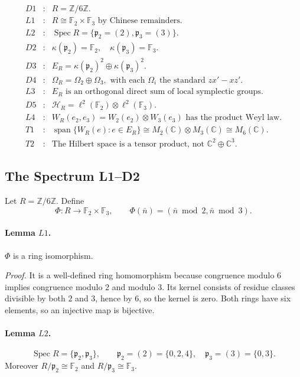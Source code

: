 \[
\begin{array}{rcl}
D1&:&R=\mathbb Z/6\mathbb Z.\\
L1&:&R\cong\mathbb F_2\times\mathbb F_3\text{ by Chinese remainders.}\\
L2&:&\operatorname{Spec}R=\{\mathfrak p_2=(2),\mathfrak p_3=(3)\}.\\
D2&:&\kappa(\mathfrak p_2)=\mathbb F_2,\quad
       \kappa(\mathfrak p_3)=\mathbb F_3.\\
D3&:&E_R=\kappa(\mathfrak p_2)^2\oplus\kappa(\mathfrak p_3)^2.\\
D4&:&\Omega_R=\Omega_2\oplus\Omega_3,\text{ with each }\Omega_i
       \text{ the standard }zx'-xz'.\\
L3&:&E_R\text{ is an orthogonal direct sum of local symplectic groups.}\\
D5&:&\mathcal H_R=\ell^2(\mathbb F_2)\otimes\ell^2(\mathbb F_3).\\
L4&:&W_R(e_2,e_3)=W_2(e_2)\otimes W_3(e_3)
       \text{ has the product Weyl law.}\\
T1&:&\operatorname{span}\{W_R(e):e\in E_R\}
       \cong M_2(\mathbb C)\otimes M_3(\mathbb C)\cong M_6(\mathbb C).\\
T2&:&\text{The Hilbert space is a tensor product, not }
       \mathbb C^2\oplus\mathbb C^3.
\end{array}
\]

\subsection{The Spectrum L1--D2}

Let \(R=\mathbb Z/6\mathbb Z\).  Define
\[
  \Phi:R\longrightarrow\mathbb F_2\times\mathbb F_3,\qquad
  \Phi(\bar n)=(\bar n\bmod 2,\bar n\bmod 3).
\]

\paragraph{Lemma \(L1\).}
\(\Phi\) is a ring isomorphism.

\emph{Proof.}
It is a well-defined ring homomorphism because congruence modulo \(6\) implies
congruence modulo \(2\) and modulo \(3\).  Its kernel consists of residue
classes divisible by both \(2\) and \(3\), hence by \(6\), so the kernel is
zero.  Both rings have six elements, so an injective map is bijective.

\paragraph{Lemma \(L2\).}
\[
  \operatorname{Spec}R=\{\mathfrak p_2,\mathfrak p_3\},
  \qquad
  \mathfrak p_2=(2)=\{0,2,4\},\quad
  \mathfrak p_3=(3)=\{0,3\}.
\]
Moreover \(R/\mathfrak p_2\cong\mathbb F_2\) and
\(R/\mathfrak p_3\cong\mathbb F_3\).

